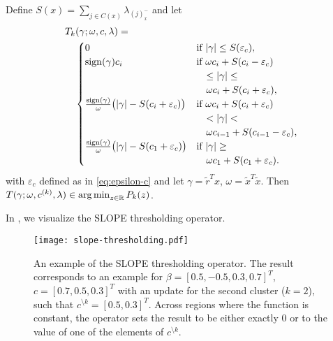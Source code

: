 \begin{theorem}
  \label{thm:thresholding-operator}
  Define \(S(x) = \sum_{j \in C(x)}\lambda_{(j)^-_{x}}\) and
  let
  \[
    \begin{multlined}
      T_k(\gamma; \omega, c, \lambda) = \\
      \begin{cases}
        0
            & \text{if } |\gamma| \leq S(\varepsilon_c),               \\
        \sign(\gamma)c_i
            & \text{if } \omega c_i + S(c_i - \varepsilon_c)           \\
            & \quad \leq |\gamma| \leq                                 \\
            & \quad \omega c_i + S(c_i + \varepsilon_c),               \\
        \frac{\sign(\gamma)}{\omega} \big( |\gamma| - S(c_i + \varepsilon_c) \big)
            & \text{if } \omega c_i + S(c_i + {\varepsilon_c})         \\
            & \quad < |\gamma| <                                       \\
            & \quad \omega c_{i - 1} + S(c_{i - 1} - {\varepsilon_c}), \\
        \frac{\sign(\gamma)}{\omega} \big( |\gamma| - S(c_1 + {\varepsilon_c}) \big)
            & \text{if } |\gamma| \geq                                 \\
            & \quad \omega c_1 + S(c_1 + {\varepsilon_c}).
      \end{cases}
    \end{multlined}
  \]
  with \({\varepsilon_c}\) defined as in \eqref{eq:epsilon-c} and let
  \(\gamma = \tilde{r}^Tx\), \(\omega = \tilde{x}^T\tilde{x}\). Then
  \(T(\gamma; \omega, c^{(k)}, \lambda) \in \operatorname*{arg\,min}_{z \in \mathbb{R}} P_k(z)\).
\end{theorem}


In , we visualize the SLOPE thresholding operator.

\begin{figure*}[htb]
  \centering
  \texttt{[image: slope-thresholding.pdf]}
  \caption{%
  An example of the SLOPE thresholding operator. The result corresponds to an
  example for \(\beta = [0.5, -0.5, 0.3, 0.7]^T\), \(c = [0.7, 0.5, 0.3]^T\)
  with an update for the second cluster (\(k = 2\)), such that
  \(c^{\setminus k} = [0.5, 0.3]^T\). Across regions where the function is constant,
      the operator sets the result to be either exactly 0 or to the value of one
      of the elements of \(c^{\setminus k}\).
    }
  \label{fig:slope-thresholding}
\end{figure*}

